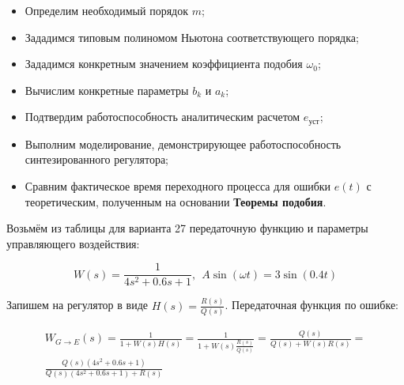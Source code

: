 \begin{itemize}
\setlength{\itemsep}{-1ex}
   \item{\begin{flushleft} Определим необходимый порядок $m$; \end{flushleft}}
   \item{\begin{flushleft} Зададимся типовым полиномом Ньютона соответствующего порядка; \end{flushleft}}
   \item{\begin{flushleft} Зададимся конкретным значением коэффициента подобия $\omega_0$; \end{flushleft}}
   \item{\begin{flushleft} Вычислим конкретные параметры $b_k$ и $a_k$; \end{flushleft}}
   \item{\begin{flushleft} Подтвердим работоспособность аналитическим расчетом $e_{\text{уст}}$; \end{flushleft}}
   \item{\begin{flushleft} Выполним моделирование, демонстрирующее работоспособность синтезированного регулятора; \end{flushleft}}
   \item{\begin{flushleft} Сравним фактическое время переходного процесса для ошибки $e(t)$ с теоретическим, полученным на основании \textbf{Теоремы подобия}.     \end{flushleft}}
\end{itemize}


Возьмём из таблицы для варианта 27 передаточную функцию и параметры управляющего воздействия:

\begin{par}
$$W(s)=\frac{1}{4s^2 +0.6s+1},~~A\sin (\omega t)=3\sin (0.4t)$$
\end{par}


Запишем на регулятор в виде $H(s)=\frac{R(s)}{Q(s)}$. Передаточная функция по ошибке:

\begin{par}
$$\begin{array}{l}
W_{G\to E} (s)=\frac{1}{1+W(s)H(s)}=\frac{1}{1+W(s)\frac{R(s)}{Q(s)}}=\frac{Q(s)}{Q(s)+W(s)R(s)}=\\
\frac{Q(s)(4s^2 +0.6s+1)}{Q(s)(4s^2 +0.6s+1)+R(s)}
\end{array}$$
\end{par}



